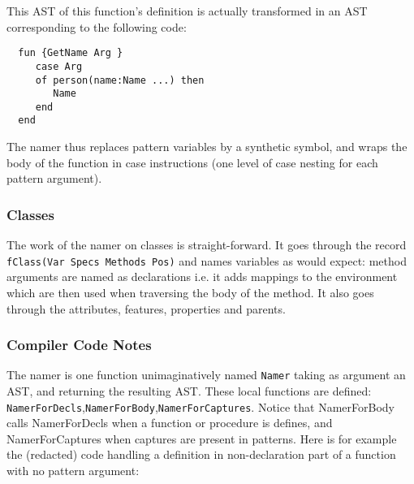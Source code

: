 \documentclass[a4paper]{memoir}
\begin{document}
This AST of this function's definition is actually transformed in an AST corresponding to the following code:
\begin{lstlisting}
  fun {GetName Arg }
     case Arg
     of person(name:Name ...) then
        Name
     end
  end
\end{lstlisting}

The namer thus replaces pattern variables by a synthetic symbol, and wraps the body of the function in case instructions (one level of case nesting for each pattern argument). 




\subsubsection{Classes}
The work of the namer on classes is straight-forward. It goes through the record
\lstinline!fClass(Var Specs Methods Pos)! and names variables as would expect:
method arguments are named as declarations i.e. it adds mappings to the
environment which are then used when traversing the body of the method.
It also goes through the attributes, features, properties and parents.


\subsubsection{Compiler Code Notes}
The namer is one function unimaginatively named \lstinline!Namer! taking as argument an AST, and returning the resulting AST.
These local functions are defined: \lstinline!NamerForDecls!,\lstinline!NamerForBody!,\lstinline!NamerForCaptures!.
Notice that NamerForBody calls NamerForDecls when a function or procedure is
defines, and NamerForCaptures when captures are present in patterns. Here is for
example the (redacted) code handling a definition in non-declaration part of a
function with no pattern argument:
\end{document}
